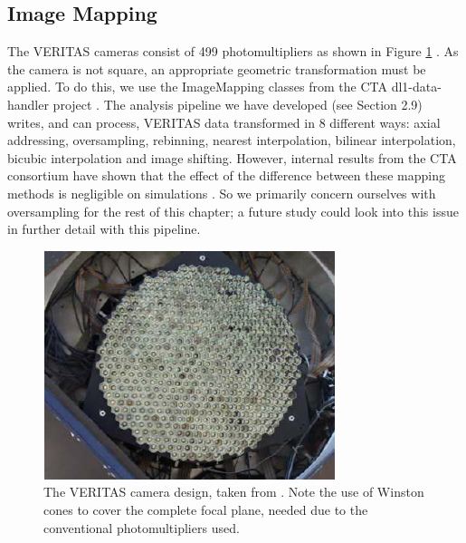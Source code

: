 \subsection{Image Mapping}
The VERITAS cameras consist of 499 photomultipliers as shown in Figure \ref{fig:verc} \cite{vercam}. As the camera is not square, an appropriate geometric transformation must be applied. To do this, we use the ImageMapping classes from the CTA dl1-data-handler project \cite{dl1dh}. The analysis pipeline we have developed (see Section 2.9) writes, and can process, VERITAS data transformed in 8 different ways: axial addressing, oversampling, rebinning, nearest interpolation, bilinear interpolation, bicubic interpolation and image shifting. However, internal results from the CTA consortium have shown that the effect of the difference between these mapping methods is negligible on simulations \cite{nietopc}. So we primarily concern ourselves with oversampling for the rest of this chapter; a future study could look into this issue in further detail with this pipeline.
\begin{figure}[h]
        \begin{center}
        \includegraphics[width=0.6\columnwidth]{figures/verc.png}

        \caption{
                \label{fig:verc} 
                The VERITAS camera design, taken from \cite{vercam}. Note the use of Winston cones to cover the complete focal plane, needed due to the conventional photomultipliers used.
        }
        \end{center}
\end{figure}


